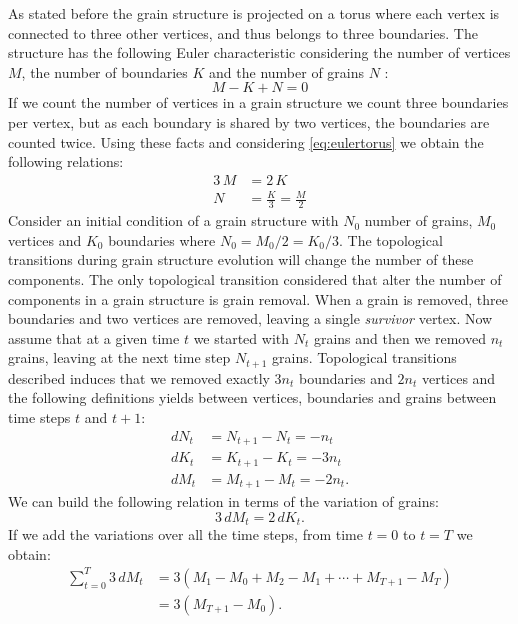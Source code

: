 As stated before the grain structure is projected on a torus where each vertex is connected to three other vertices, and thus belongs to three boundaries. The structure has the following Euler characteristic considering the number of vertices $M$, the number of boundaries $K$ and the number of grains $N$ \cite{sausset2007periodic}:
\begin{equation}
M - K + N = 0
\label{eq:eulertorus}
\end{equation}
If we count the number of vertices in a grain structure we count three boundaries per vertex, but as each boundary is shared by two vertices, the boundaries are counted twice. Using these facts and considering \eqref{eq:eulertorus} we obtain the following relations:
\begin{align*}
    3\,M &= 2\,K\\
    N &= \frac{K}{3} = \frac{M}{2}
\end{align*}
 Consider an initial condition of a grain structure with $N_0$ number of grains, $M_0$ vertices and $K_0$ boundaries where $N_0 = M_0/2 = K_0 / 3$. 
 The topological transitions during grain structure evolution will change the number of these components. 
 The only topological transition considered that alter the number of components in a grain structure is  grain removal. 
 When a grain is removed, three boundaries and two vertices are removed, leaving a single \emph{survivor} vertex.
 Now assume that at a given time $t$ we started with $N_t$ grains and then we removed $n_t$ grains, leaving at the next time step $N_{t+1}$ grains.
 Topological transitions described induces that we removed exactly $3n_t$ boundaries and $2n_t$ vertices and the following definitions yields between vertices, boundaries and grains between time steps $t$ and $t+1$:
 \begin{align*}
     dN_t &= N_{t+1} - N_{t} =  - n_t\\
     dK_t &= K_{t+1} - K_{t} = - 3n_t\\
     dM_t &= M_{t+1} - M_{t} = - 2n_t.
 \end{align*}
We can build the following relation in terms of the variation of grains:
\begin{equation}
    3\,dM_t = 2\,dK_t. \label{eq:dMdK}
\end{equation}
If we add the variations over all the time steps, from time $t=0$ to $t=T$ we obtain:
\begin{align*}
    \sum_{t=0}^{T}3\,dM_t &= 3(M_1 - M_0 + M_2 - M_1 + \cdots + M_{T+1} - M_T) \\
    &= 3(M_{T+1} - M_0).
\end{align*}
